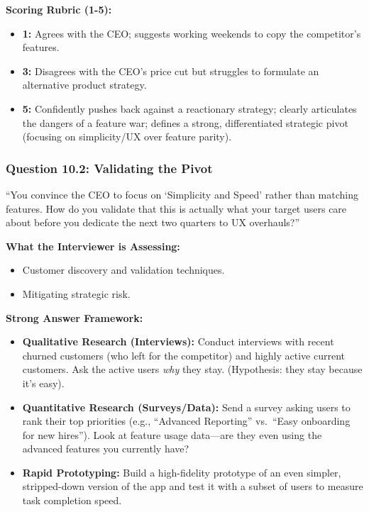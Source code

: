 \textbf{Scoring Rubric (1-5):}

\begin{itemize}
\tightlist
\item
  \textbf{1:} Agrees with the CEO; suggests working weekends to copy the
  competitor's features.
\item
  \textbf{3:} Disagrees with the CEO's price cut but struggles to
  formulate an alternative product strategy.
\item
  \textbf{5:} Confidently pushes back against a reactionary strategy;
  clearly articulates the dangers of a feature war; defines a strong,
  differentiated strategic pivot (focusing on simplicity/UX over feature
  parity).
\end{itemize}

\subsubsection{Question 10.2: Validating the
Pivot}\label{question-10.2-validating-the-pivot}

``You convince the CEO to focus on `Simplicity and Speed' rather than
matching features. How do you validate that this is actually what your
target users care about before you dedicate the next two quarters to UX
overhauls?''

\textbf{What the Interviewer is Assessing:}

\begin{itemize}
\tightlist
\item
  Customer discovery and validation techniques.
\item
  Mitigating strategic risk.
\end{itemize}

\textbf{Strong Answer Framework:}

\begin{itemize}
\tightlist
\item
  \textbf{Qualitative Research (Interviews):} Conduct interviews with
  recent churned customers (who left for the competitor) and highly
  active current customers. Ask the active users \emph{why} they stay.
  (Hypothesis: they stay because it's easy).
\item
  \textbf{Quantitative Research (Surveys/Data):} Send a survey asking
  users to rank their top priorities (e.g., ``Advanced Reporting''
  vs.~``Easy onboarding for new hires''). Look at feature usage
  data---are they even using the advanced features you currently have?
\item
  \textbf{Rapid Prototyping:} Build a high-fidelity prototype of an even
  simpler, stripped-down version of the app and test it with a subset of
  users to measure task completion speed.
\end{itemize}

